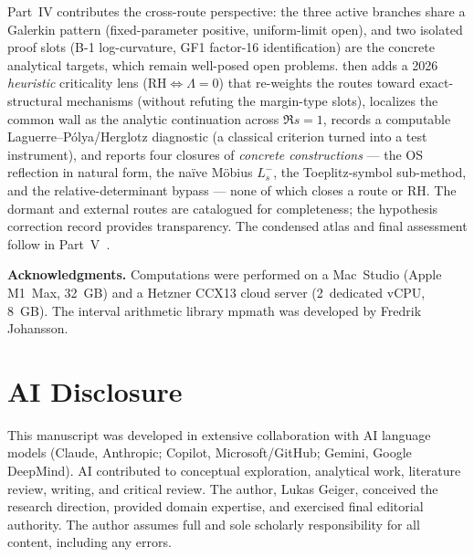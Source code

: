 \documentclass[12pt,a4paper]{article}
\theoremstyle{definition}
\theoremstyle{remark}
\begin{document}
Part~IV contributes the cross-route perspective: the three active
branches share a Galerkin pattern (fixed-parameter positive, uniform-limit
open), and two isolated proof slots (B-1 log-curvature, GF1
factor-16 identification) are the concrete analytical targets, which remain
well-posed open problems.  then adds a 2026
\emph{heuristic} criticality lens ($\mathrm{RH}\Leftrightarrow\Lambda=0$) that
re-weights the routes toward exact-structural mechanisms (without refuting the
margin-type slots), localizes the common wall as the analytic continuation across
$\Re s=1$, records a computable Laguerre--P\'olya/Herglotz diagnostic (a
classical criterion turned into a test instrument), and reports four closures of
\emph{concrete constructions} --- the OS reflection in natural form, the na\"ive
M\"obius $L_s^-$, the Toeplitz-symbol sub-method, and the relative-determinant
bypass --- none of which closes a route or RH. The dormant
and external routes are catalogued for completeness; the hypothesis
correction record provides transparency. The condensed atlas and final
assessment follow in Part~V~\cite{Geiger2026partV}.


\bigskip
\noindent\textbf{Acknowledgments.} Computations were performed on a
Mac~Studio (Apple M1~Max, 32~GB) and a Hetzner CCX13 cloud server
(2~dedicated vCPU, 8~GB). The interval arithmetic library mpmath was
developed by Fredrik Johansson.


\section*{AI Disclosure}

This manuscript was developed in extensive collaboration with AI language
models (Claude, Anthropic; Copilot, Microsoft/GitHub; Gemini, Google
DeepMind). AI contributed to conceptual exploration, analytical work,
literature review, writing, and critical review. The author, Lukas
Geiger, conceived the research direction, provided domain expertise, and
exercised final editorial authority. The author assumes full and sole
scholarly responsibility for all content, including any errors.




\end{document}
